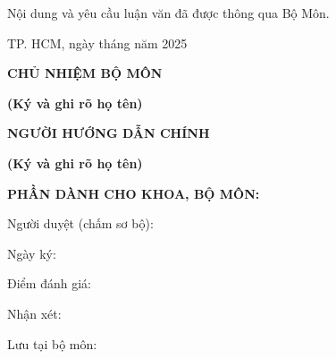 \noindent
Nội dung và yêu cầu luận văn đã được thông qua Bộ Môn.

\vspace{0.4cm}

\noindent
\hfill TP. HCM, ngày \dotfill tháng \dotfill năm 2025

\vspace{1.5cm}

\begin{center}
\parbox{0.45\textwidth}{
    \centering
    \textbf{CHỦ NHIỆM BỘ MÔN}
    
    \vspace{2.0cm}
    
    \textbf{\small (Ký và ghi rõ họ tên)}
}
\hfill
\parbox{0.45\textwidth}{
    \centering
    \textbf{NGƯỜI HƯỚNG DẪN CHÍNH}
    
    \vspace{2.0cm}
    
    \textbf{\small (Ký và ghi rõ họ tên)}
}
\end{center}

\vspace{1.0cm}

\noindent
\textbf{PHẦN DÀNH CHO KHOA, BỘ MÔN:}

\vspace{0.3cm}

\noindent
\small Người duyệt (chấm sơ bộ): \dotfill

\vspace{0.2cm}
\noindent
\small Ngày ký: \dotfill

\vspace{0.2cm}
\noindent
\small Điểm đánh giá: \dotfill

\vspace{0.2cm}
\noindent
\small Nhận xét: \dotfill

\vspace{0.2cm}
\noindent
\phantom{Nhận xét: }\dotfill

\vspace{0.2cm}
\noindent
\small Lưu tại bộ môn: \dotfill
\cleardoublepage
